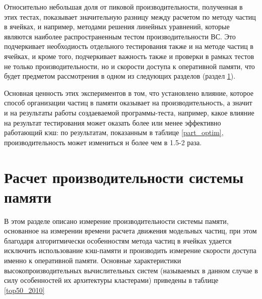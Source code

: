 Относительно небольшая доля от пиковой производительности, полученная в этих тестах, показывает значительную разницу между расчетом по методу частиц в ячейках, и например, методами решения линейных уравнений, которые являются наиболее распространенным тестом производительности ВС. Это подчеркивает необходиость отдельного тестирования также и на методе частиц в ячейках, и кроме того, подчеркивает важность также и проверки в рамках тестов не только производительности, но и скорости доступа к оперативной памяти, что будет предметом рассмотрения в одном из следующих разделов (раздел \ref{perfRAM}). 

Основная ценность этих экспериментов в том, что установлено влияние, которое способ организации частиц в памяти оказывает на производительность, а значит и на результаты работы создаеваемой программы-теста, например, какое влияние на результат тестирования может оказать более или менее эффективно работающий кэш: по результатам, показанным в таблице \ref{part_optim}, производительность может измениться н более чем в 1.5-2 раза.


\section{Расчет производительности системы памяти}
\label{perfRAM}
В этом разделе описано измерение производительности системы памяти, основанное на измерении времени расчета движения модельных частиц, при этом благодаря алгоритмически особенностям метода частиц в ячейках удается исключить использование кэш-памяти и производить измерение скорости доступа именно к оперативной памяти. Основные характеристики высокопроизводительных вычислительных систем (называемых в данном случае в силу особенностей их архитектуры кластерами) приведены в таблице \ref{top50_2010}

